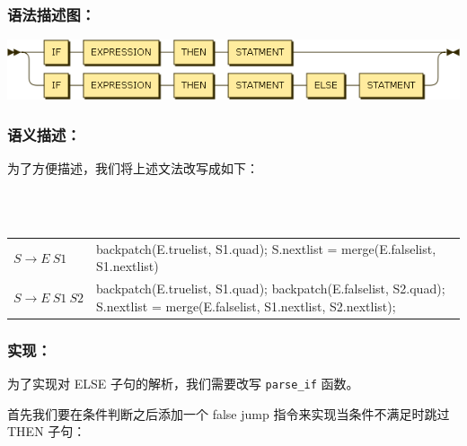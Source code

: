 \documentclass[]{guo}
\begin{document}
\subsubsection{语法描述图：}
{\centering\includegraphics[scale=0.75]{figure/if-stmt-railroad.png}}

\subsubsection{语义描述：}

为了方便描述，我们将上述文法改写成如下：

\begin{bnf*}
        { }\\
        {  }\\
\end{bnf*}

\begin{table}[H]
    \centering
    \begin{tabular}{l p{10cm}}
        $S \rightarrow E \ S1$ & backpatch(E.truelist, S1.quad); \newline
                                 S.nextlist = merge(E.falselist, S1.nextlist) \\
        $S \rightarrow E \ S1 \ S2$ & backpatch(E.truelist, S1.quad); \newline
                                      backpatch(E.falselist, S2.quad); \newline
                                      S.nextlist = merge(E.falselist, S1.nextlist, S2.nextlist);
    \end{tabular}
\end{table}

\subsubsection{实现：}

为了实现对 ELSE 子句的解析，我们需要改写 \texttt{parse_if} 函数。

首先我们要在条件判断之后添加一个 false jump 指令来实现当条件不满足时跳过 THEN 子句：

\inputminted[baselinestretch=0.75,firstline=1822,lastline=1824,fontsize=\fontlm]{cpp}{Unit1.cpp}
\end{document}
